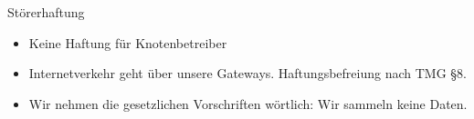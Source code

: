 \documentclass[t]{beamer}
\begin{document}

  \begin{frame}{Störerhaftung}
    \begin{itemize}
      \item Keine Haftung für Knotenbetreiber
      \item Internetverkehr geht über unsere Gateways. Haftungsbefreiung nach TMG \S8.
      \item Wir nehmen die gesetzlichen Vorschriften wörtlich: Wir sammeln keine Daten.
    \end{itemize}
  \end{frame}
\end{document}

